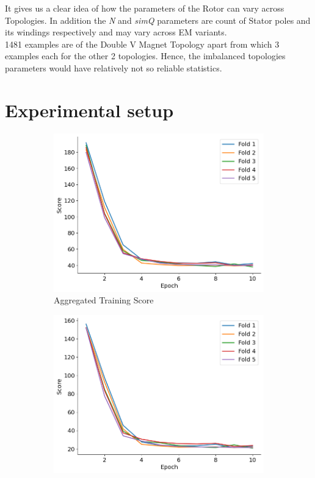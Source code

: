 \documentclass{report} %
\begin{document}
It gives us a clear idea of how the parameters of the Rotor can vary across Topologies.
In addition the \textit{N} and \textit{simQ} parameters are count of Stator poles and its windings respectively and may vary across \ac{EM} variants.\\
1481 examples are of the Double V Magnet Topology apart from which 3 examples each for the other 2 topologies.
Hence, the imbalanced topologies parameters would have relatively not so reliable statistics.\\ 

\section{Experimental setup}
\label{sec:Experimental setup}

\begin{figure}[H]
    \centering
    \begin{subfigure}{0.32\textwidth}
        \centering
        \includegraphics[width=\textwidth]{./ReportImages/train_score.png}
        \caption{\centering Aggregated Training Score}
        \label{fig:Aggregated Training Score}
    \end{subfigure}\hfill
    \begin{subfigure}{0.32\textwidth}
        \centering
        \includegraphics[width=\textwidth]{./ReportImages/train_score_y1.png}

\end{subfigure}
\end{figure}
\end{document}
